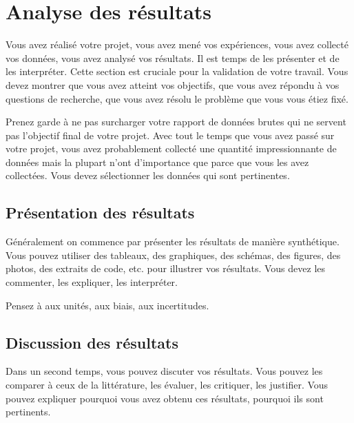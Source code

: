 \chapter{Analyse des résultats}

Vous avez réalisé votre projet, vous avez mené vos expériences, vous avez collecté vos données, vous avez analysé vos résultats. Il est temps de les présenter et de les interpréter. Cette section est cruciale pour la validation de votre travail. Vous devez montrer que vous avez atteint vos objectifs, que vous avez répondu à vos questions de recherche, que vous avez résolu le problème que vous vous étiez fixé.

Prenez garde à ne pas surcharger votre rapport de données brutes qui ne servent pas l'objectif final de votre projet. Avec tout le temps que vous avez passé sur votre projet, vous avez probablement collecté une quantité impressionnante de données mais la plupart n'ont d'importance que parce que vous les avez collectées. Vous devez sélectionner les données qui sont pertinentes.

\section{Présentation des résultats}

Généralement on commence par présenter les résultats de manière synthétique. Vous pouvez utiliser des tableaux, des graphiques, des schémas, des figures, des photos, des extraits de code, etc. pour illustrer vos résultats. Vous devez les commenter, les expliquer, les interpréter.

Pensez à aux unités, aux biais, aux incertitudes.

\section{Discussion des résultats}

Dans un second temps, vous pouvez discuter vos résultats. Vous pouvez les comparer à ceux de la littérature, les évaluer, les critiquer, les justifier. Vous pouvez expliquer pourquoi vous avez obtenu ces résultats, pourquoi ils sont pertinents.
